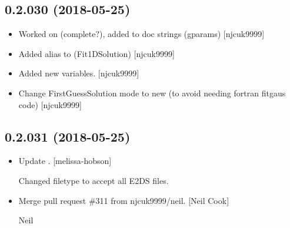 \documentclass[a4paper,10pt,english]{report}
\begin{document}
\subsection{0.2.030 (2018-05-25)}
\label{\detokenize{misc/changelog:id431}}\begin{itemize}
\item {} 
Worked on  (complete?), added to doc strings (gparams)
{[}njcuk9999{]}

\item {} 
Added alias to  (Fit1DSolution) {[}njcuk9999{]}

\item {} 
Added new  variables. {[}njcuk9999{]}

\item {} 
Change FirstGuessSolution mode to new (to avoid needing fortran
fitgaus code) {[}njcuk9999{]}

\end{itemize}


\subsection{0.2.031 (2018-05-25)}
\label{\detokenize{misc/changelog:id432}}\begin{itemize}
\item {} 
Update . {[}melissa-hobson{]}

Changed filetype to accept all E2DS files.

\item {} 
Merge pull request \#311 from njcuk9999/neil. {[}Neil Cook{]}

Neil

\end{itemize}
\end{document}
